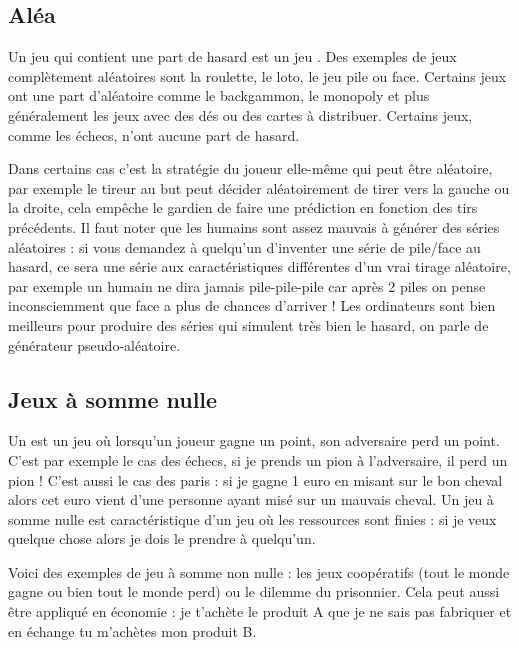 \documentclass[11pt,class=report,crop=false]{standalone}
\begin{document}
\subsection{Aléa}

Un jeu qui contient une part de hasard est un jeu .
Des exemples de jeux complètement aléatoires sont la roulette, le loto, le jeu pile ou face. Certains jeux ont une part d'aléatoire comme le backgammon, le monopoly et plus généralement les jeux avec des dés ou des cartes à distribuer. Certains jeux, comme les échecs, n'ont aucune part de hasard.

Dans certains cas c'est la stratégie du joueur elle-même qui peut être aléatoire, par exemple le tireur au but peut décider aléatoirement de tirer vers la gauche ou la droite, cela empêche le gardien de faire une prédiction en fonction des tirs précédents.
Il faut noter que les humains sont assez mauvais à générer des séries aléatoires : si vous demandez à quelqu'un d'inventer une série de pile/face au hasard, ce sera une série aux caractéristiques différentes d'un vrai tirage aléatoire, par exemple un humain ne dira jamais \og{}pile-pile-pile\fg{} car après 2 \og{}piles\fg{} on pense inconsciemment que \og{}face\fg{} a plus de chances d'arriver ! 
Les ordinateurs sont bien meilleurs pour produire des séries qui simulent très bien le hasard, on parle de générateur \og{}pseudo-aléatoire\fg{}.


\subsection{Jeux à somme nulle}

Un  est un jeu où lorsqu'un joueur gagne un point, son adversaire perd un point.
C'est par exemple le cas des échecs, si je prends un pion à l'adversaire, il perd un pion ! C'est aussi le cas des paris : si je gagne 1 euro en misant sur le bon cheval alors cet euro vient d'une personne ayant misé sur un mauvais cheval. Un jeu à somme nulle est caractéristique d'un jeu où les ressources sont finies : si je veux quelque chose alors je dois le prendre à quelqu'un.

Voici des exemples de jeu à somme non nulle : les jeux coopératifs (tout le monde gagne ou bien tout le monde perd) ou le dilemme du prisonnier. Cela peut aussi être appliqué en économie : je t'achète le produit A que je ne sais pas fabriquer et en échange tu m'achètes mon produit B.
\end{document}

